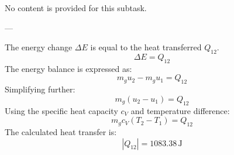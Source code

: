 No content is provided for this subtask.  

---

The energy change \( \Delta E \) is equal to the heat transferred \( Q_{12} \).  
\[
\Delta E = Q_{12}
\]  
The energy balance is expressed as:  
\[
m_g u_2 - m_g u_1 = Q_{12}
\]  
Simplifying further:  
\[
m_g (u_2 - u_1) = Q_{12}
\]  
Using the specific heat capacity \( c_V \) and temperature difference:  
\[
m_g c_V (T_2 - T_1) = Q_{12}
\]  
The calculated heat transfer is:  
\[
|Q_{12}| = 1083.38 \, \text{J}
\]